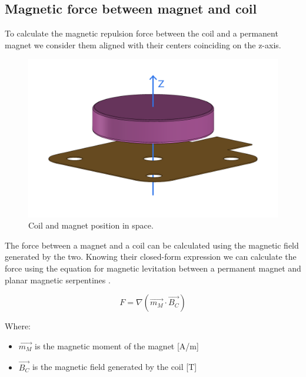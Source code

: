 \subsection{Magnetic force between magnet and coil}

\begin{samepage}
    To calculate the magnetic repulsion force between the coil and a permanent magnet we consider them aligned with their centers coinciding on the z-axis.
    \nopagebreak

    \begin{figure}[H]
        \centering
        \includegraphics[width=0.5\columnwidth]{Chapters/Chapter2/Modelling_of_Entire_System/Figures/coil_magnet.png} 
        \caption[Coil-Magnet position]{Coil and magnet position in space.}
        \label{fig: Coil-Magnet_position}
    \end{figure}
\end{samepage}

\begin{samepage}
    The force between a magnet and a coil can be calculated using the magnetic field generated by the two.
    Knowing their closed-form expression we can calculate the force using the equation for magnetic levitation between a permanent magnet and planar magnetic serpentines \cite{wiki:magnetic_levitation}.
    \nopagebreak

    \begin{equation}
        F = \nabla (\overrightarrow{m_M} \cdot \overrightarrow{B_C}) %
        \label{eq: Magnetic_force_coil_magnet}
    \end{equation}
    \nopagebreak

    Where: 
    \begin{itemize}
        \item $\overrightarrow{m_M}$ is the magnetic moment of the magnet [A/m]
        \item $\overrightarrow{B_C}$ is the magnetic field generated by the coil [T]
    \end{itemize}
\end{samepage}

